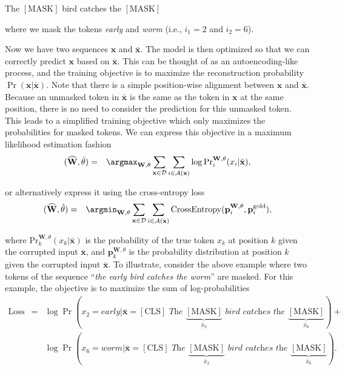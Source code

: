 \vspace{0.5em}
\begin{center}
The $[\mathrm{MASK}]$ bird catches the $[\mathrm{MASK}]$
\end{center}
\vspace{0.5em}

\noindent where we mask the tokens \textit{early} and \textit{worm} (i.e., $i_1 = 2$ and $i_2 = 6$).

Now we have two sequences $\mathbf{x}$ and $\bar{\mathbf{x}}$. The model is then optimized so that we can correctly predict $\mathbf{x}$ based on $\bar{\mathbf{x}}$. This can be thought of as an autoencoding-like process, and the training objective is to maximize the reconstruction probability $\Pr(\mathbf{x}|\bar{\mathbf{x}})$. Note that there is a simple position-wise alignment between $\mathbf{x}$ and $\bar{\mathbf{x}}$. Because an unmasked token in $\bar{\mathbf{x}}$ is the same as the token in $\mathbf{x}$ at the same position, there is no need to consider the prediction for this unmasked token. This leads to a simplified training objective which only maximizes the probabilities for masked tokens. We can express this objective in a maximum likelihood estimation fashion
\begin{eqnarray}
(\widehat{\mathbf{W}},\hat{\theta}) & = & \argmax_{\mathbf{W},\theta} \sum_{\mathbf{x} \in \mathcal{D}} \sum_{i \in \mathcal{A}(\mathbf{x})} \log \mathrm{Pr}_{i}^{\mathbf{W},\theta}(x_{i}|\bar{\mathbf{x}}),
\end{eqnarray}

\noindent or alternatively express it using the cross-entropy loss
\begin{eqnarray}
(\widehat{\mathbf{W}},\hat{\theta}) & = & \argmin_{\mathbf{W},\theta} \sum_{\mathbf{x} \in \mathcal{D}} \sum_{i \in \mathcal{A}(\mathbf{x})} \mathrm{CrossEntropy}(\mathbf{p}_{i}^{\mathbf{W},\theta},\mathbf{p}_{i}^{\mathrm{gold}}),
\end{eqnarray}

\noindent where $\mathrm{Pr}_k^{\mathbf{W},\theta}(x_k|\bar{\mathbf{x}})$ is the probability of the true token $x_k$ at position $k$ given the corrupted input $\bar{\mathbf{x}}$, and $\mathbf{p}_{k}^{\mathbf{W},\theta}$ is the probability distribution at position $k$ given the corrupted input $\bar{\mathbf{x}}$. To illustrate, consider the above example where two tokens of the sequence ``\textit{the early bird catches the worm}'' are masked. For this example, the objective is to maximize the sum of log-probabilities
\begin{eqnarray}
\mathrm{Loss} & = & \log \Pr(x_2 = \textit{early}|\bar{\mathbf{x}}=\textit{$[\mathrm{CLS}]$ The $\underbrace{[\mathrm{MASK}]}_{\bar{x}_2}$ bird catches the $\underbrace{[\mathrm{MASK}]}_{\bar{x}_6}$}) + \nonumber \\
  &   & \log \Pr(x_6 = \textit{worm}|\bar{\mathbf{x}}=\textit{$[\mathrm{CLS}]$ The $\underbrace{[\mathrm{MASK}]}_{\bar{x}_2}$ bird catches the $\underbrace{[\mathrm{MASK}]}_{\bar{x}_6}$}).
\end{eqnarray}

